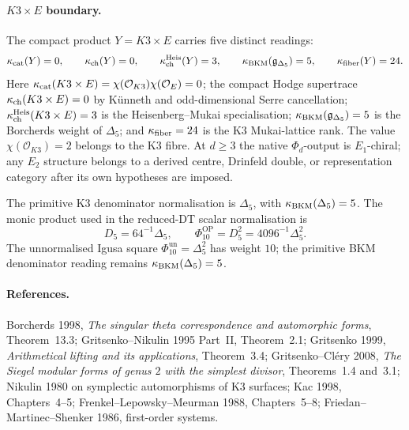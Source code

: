 \paragraph{\(K3\times E\) boundary.}
The compact product \(Y=K3\times E\) carries five distinct readings:
\[
  \kappa_{\mathrm{cat}}(Y)=0,\qquad
  \kappa_{\mathrm{ch}}(Y)=0,\qquad
  \kappa_{\mathrm{ch}}^{\mathrm{Heis}}(Y)=3,\qquad
  \kappa_{\mathrm{BKM}}(\mathfrak g_{\Delta_5})=5,\qquad
  \kappa_{\mathrm{fiber}}(Y)=24.
\]
Here \(\kappa_{\mathrm{cat}}(K3\times E)=\chi(\mathcal O_{K3})\chi(\mathcal O_E)=0\);
the compact Hodge supertrace \(\kappa_{\mathrm{ch}}(K3\times E)=0\) by K\"unneth and
odd-dimensional Serre cancellation; \(\kappa_{\mathrm{ch}}^{\mathrm{Heis}}(K3\times
E)=3\) is the Heisenberg--Mukai specialisation; \(\kappa_{\mathrm{BKM}}(\mathfrak
g_{\Delta_5})=5\) is the Borcherds weight of \(\Delta_5\); and
\(\kappa_{\mathrm{fiber}}=24\) is the K3 Mukai-lattice rank.  The value
\(\chi(\mathcal O_{K3})=2\) belongs to the K3 fibre.  At \(d\geq 3\)
the native \(\Phi_d\)-output is \(E_1\)-chiral; any \(E_2\) structure
belongs to a derived centre, Drinfeld double, or representation category
after its own hypotheses are imposed.

The primitive K3 denominator normalisation is \(\Delta_5\), with
\(\kappa_{\mathrm{BKM}}(\Delta_5)=5\).  The monic product used in the reduced-DT scalar
normalisation is
\[
  D_5 = 64^{-1}\Delta_5,\qquad
  \Phi_{10}^{\mathrm{OP}} = D_5^2 = 4096^{-1}\Delta_5^2 .
\]
The unnormalised Igusa square \(\Phi_{10}^{\mathrm{un}}=\Delta_5^2\)
has weight \(10\); the primitive BKM denominator reading remains
\(\kappa_{\mathrm{BKM}}(\Delta_5)=5\).

\paragraph{References.}
Borcherds 1998, \emph{The singular theta correspondence and
automorphic forms}, Theorem~13.3; Gritsenko--Nikulin 1995 Part~II,
Theorem~2.1; Gritsenko 1999, \emph{Arithmetical lifting and its
applications}, Theorem~3.4; Gritsenko--Cl\'ery 2008,
\emph{The Siegel modular forms of genus \(2\) with the simplest
divisor}, Theorems~1.4 and~3.1; Nikulin 1980 on symplectic
automorphisms of K3 surfaces; Kac 1998, Chapters~4--5;
Frenkel--Lepowsky--Meurman 1988, Chapters~5--8;
Friedan--Martinec--Shenker 1986, first-order systems.

